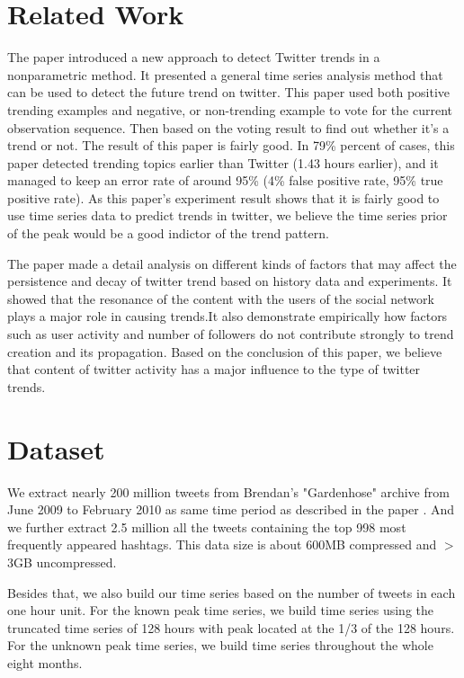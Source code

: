 \documentclass{article}
\begin{document}
\section{Related Work} 
The paper \cite{nikolov2012trend} introduced a new approach to detect Twitter trends in a nonparametric method. It presented a general time series analysis method that can be used to detect the future trend on twitter. This paper used both positive trending examples and negative, or non-trending example to vote for the current observation sequence. Then based on the voting result to find out whether it's a trend or not. The result of this paper is fairly good. In 79\% percent of cases, this paper detected trending topics earlier than Twitter (1.43 hours earlier), and it managed to keep an error rate of around 95\% (4\% false positive rate, 95\% true positive rate). As this paper's experiment result shows that it is fairly good to use time series data to predict trends in twitter, we believe the time series prior of the peak would be a good indictor of the trend pattern.
 
The paper \cite{journals/corr/abs-1102-1402} made a detail analysis on different kinds of factors that may affect the persistence and decay of twitter trend based on history data and experiments. It showed that the resonance of the content with the users of the social network plays a major role in causing trends.It also demonstrate empirically how factors such
as user activity and number of followers do not contribute strongly to trend creation and its propagation. Based on the conclusion of this paper, we believe that content of twitter activity has a major influence to the type of twitter trends.


\section{Dataset} 

We extract nearly 200 million tweets from Brendan's "Gardenhose" archive from June 2009 to February 2010 as same time period as described in the paper \cite{Yang11}. And we further extract 2.5 million all the tweets containing the top 998 most frequently appeared hashtags. This data size is about 600MB compressed and $>$3GB uncompressed.  

Besides that, we also build our time series based on the number of tweets in each one hour unit. For the known peak time series, we build time series using the truncated time series of 128 hours with peak located at the 1/3 of the 128 hours. For the unknown peak time series, we build time series throughout the whole eight months. 
\end{document}
